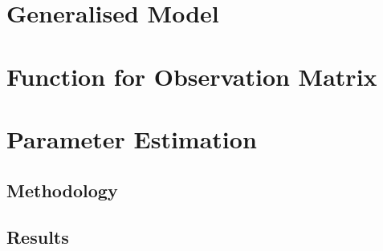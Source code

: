 
\section{Generalised Model}
\label{Generalising_the_Observation_Matrix:Generalised_Model}

\section{Function for Observation Matrix}
\label{Generalising_the_Observation_Matrix:Function_For_Observation_Matrix}

\section{Parameter Estimation}
\label{Generalising_the_Observation_Matrix:Parameter_Estimation}

    \subsection{Methodology}
    \label{Generalising_the_Observation_Matrix:Parameter_Estimation:Methodology}

    \subsection{Results}
    \label{Generalising_the_Observation_Matrix:Parameter_Estimation:Results}






